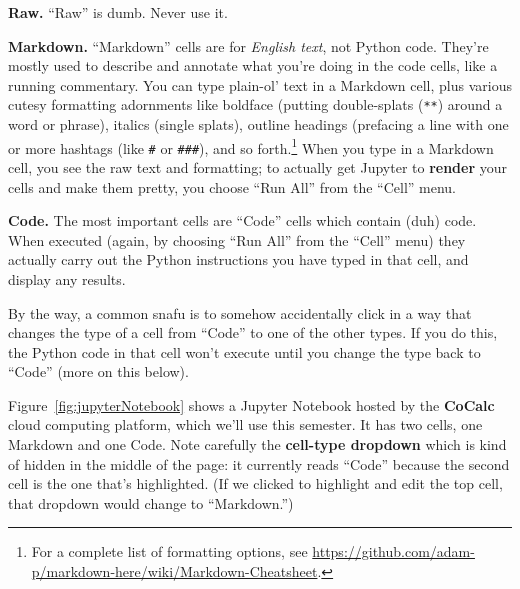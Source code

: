 \begin{description}
\item{\textbf{Raw.}} ``Raw'' is dumb. Never use it.
\item{\textbf{Markdown.}} ``Markdown'' cells are for \textit{English text}, not Python
code. They're mostly used to describe and annotate what you're doing in the
code cells, like a running commentary. You can type plain-ol' text in a
Markdown cell, plus various cutesy formatting adornments like boldface (putting
double-splats (\texttt{**}) around a word or phrase), italics (single splats),
outline headings (prefacing a line with one or more hashtags (like \texttt{\#}
or \texttt{\#\#\#}), and so forth.\footnote{For a complete list of formatting
options, see
\url{https://github.com/adam-p/markdown-here/wiki/Markdown-Cheatsheet}.} When
you type in a Markdown cell, you see the raw text and formatting; to actually get Jupyter to
\textbf{render} your cells and make them pretty, you choose ``Run All'' from
the   ``Cell'' menu.

\item{\textbf{Code.}} The most important cells are ``Code'' cells which contain (duh)
code. When executed (again, by choosing ``Run All'' from the ``Cell'' menu) they actually carry out
the Python instructions you have typed in that cell, and display any results.

\end{description}

By the way, a common snafu is to somehow accidentally click in a way that
changes the type of a cell from ``Code'' to one of the other types. If you do
this, the Python code in that cell won't execute until you change the type back
to ``Code'' (more on this below).

Figure~\ref{fig:jupyterNotebook} shows a Jupyter Notebook hosted by the
\textbf{CoCalc} cloud computing platform, which we'll use this semester. It has
two cells, one Markdown and one Code. Note carefully the \textbf{cell-type
dropdown} which is kind of hidden in the middle of the page: it currently reads
``Code'' because the second cell is the one that's highlighted. (If we clicked
to highlight and edit the top cell, that dropdown would change to
``Markdown.'')

